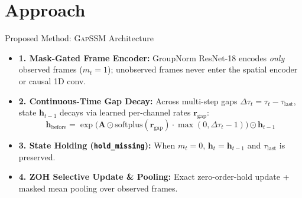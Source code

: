 \documentclass[aspectratio=169,11pt]{beamer}
\begin{document}
\section{Approach}
\begin{frame}{Proposed Method: \textsc{GapSSM} Architecture}
\begin{itemize}
    \item \textbf{1. Mask-Gated Frame Encoder:} GroupNorm ResNet-18 encodes \emph{only} observed frames ($m_t=1$); unobserved frames never enter the spatial encoder or causal 1D conv.
    \item \textbf{2. Continuous-Time Gap Decay:} Across multi-step gaps $\Delta\tau_t = \tau_t - \tau_{\text{last}}$, state $\mathbf{h}_{t-1}$ decays via learned per-channel rates $\mathbf{r}_{\text{gap}}$:
    \[
        \mathbf{h}_{\text{before}} = \exp\bigl(\mathbf{A} \odot \text{softplus}(\mathbf{r}_{\text{gap}}) \cdot \max(0, \Delta\tau_t - 1)\bigr) \odot \mathbf{h}_{t-1}
    \]
    \item \textbf{3. State Holding (\texttt{hold\_missing}):} When $m_t=0$, $\mathbf{h}_t = \mathbf{h}_{t-1}$ and $\tau_{\text{last}}$ is preserved.
    \item \textbf{4. ZOH Selective Update & Pooling:} Exact zero-order-hold update + masked mean pooling over observed frames.
\end{itemize}
\end{frame}
\end{document}
